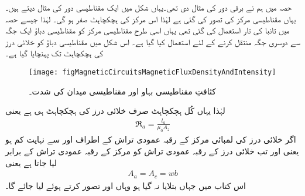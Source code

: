 حصہ   میں ہم نے برقی دور کی مثال دی تھی۔یہاں شکل  میں ایک مقناطیسی دور کی  مثال دیتے ہیں۔یہاں مقناطیسی مرکز کی  تصور کی گئی ہے لہٰذا اس مرکز کی ہچکچاہٹ  صفر ہو گی۔ لہٰذا جیسے حصہ    میں تانبا کی تار استعمال کی گئی تھی یہاں اسی طرح مقناطیسی مرکز کو مقناطیسی دباؤ  ایک جگہ سے دوسری جگہ منتقل کرنے کے لئے استعمال کیا گیا ہے۔ اس شکل میں مقناطیسی دباؤ کو خلائی درز کی ہچکچاہٹ  تک پہنچایا گیا ہے۔
\begin{figure}
\centering
\texttt{[image: figMagneticCircuitsMagneticFluxDensityAndIntensity]}
\caption{کثافتِ مقناطیسی بہاو اور مقناطیسی میدان کی شدت۔}
\label{شکل_مقناطیسی__کثافت_مقناطیسی_بہاو_اور_شدت}
\end{figure}
لہٰذا یہاں کُل ہچکچاہٹ صرف خلائی درز کی ہچکچاہٹ ہی ہے یعنی
\begin{align}
\Re_a=\frac{l_a}{\mu_0 A_z}
\end{align}
اگر خلائی درز کی لمبائی  مرکز کے رقبہ عمودی تراش کے اطراف  اور  سے نہایت کم ہو یعنی  اور  تب خلائی درز کے رقبہ عمودی تراش  کو مرکز کے رقبہ عمودی تراش  کے برابر لیا جاتا ہے یعنی
\begin{align}
A_a=A_c=w b
\end{align}
 اس کتاب میں جہاں بتلایا نہ گیا ہو وہاں  اور  تصور کرتے ہوئے  لیا جائے گا۔
 
